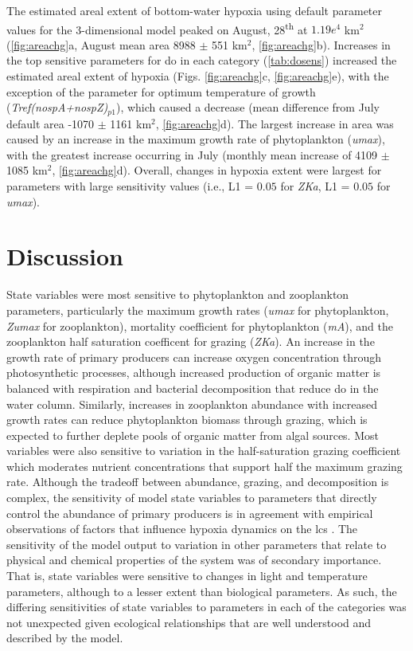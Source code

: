 \documentclass[review]{elsarticle}\usepackage[]{graphicx}\usepackage[]{color}
\begin{document}
The estimated areal extent of bottom-water hypoxia using default parameter values for the 3-dimensional model peaked on August, 28\textsuperscript{th} at $1.19e^{4}$ km$^2$ (\cref{fig:areachg}a, August mean area 8988 $\pm$ 551 km$^2$, \cref{fig:areachg}b). Increases in the top sensitive parameters for \ac{do} in each category (\cref{tab:dosens}) increased the estimated areal extent of hypoxia (Figs. \ref{fig:areachg}c, \ref{fig:areachg}e), with the exception of the parameter for optimum temperature of growth (\textit{Tref(nospA+nospZ)$_{p1}$}), which caused a decrease (mean difference from July default area -1070 $\pm$ 1161 km$^2$, \cref{fig:areachg}d).  The largest increase in area was caused by an increase in the maximum growth rate of phytoplankton (\textit{umax}), with the greatest increase occurring in July (monthly mean increase of 4109 $\pm$ 1085 km$^2$, \cref{fig:areachg}d).  Overall, changes in hypoxia extent were largest for parameters with large sensitivity values (i.e., L1 = $0.05$ for \textit{ZKa}, L1 = $0.05$ for \textit{umax}).

\section{Discussion}

State variables were most sensitive to phytoplankton and zooplankton parameters, particularly the maximum growth rates (\textit{umax} for phytoplankton, \textit{Zumax} for zooplankton), mortality coefficient for phytoplankton (\textit{mA}), and the zooplankton half saturation coefficent for grazing (\textit{ZKa}). An increase in the growth rate of primary producers can increase oxygen concentration through photosynthetic processes, although increased production of organic matter is balanced with respiration and bacterial decomposition that reduce \ac{do} in the water column.  Similarly, increases in zooplankton abundance with increased growth rates can reduce phytoplankton biomass through grazing, which is expected to further deplete pools of organic matter from algal sources.  Most variables were also sensitive to variation in the half-saturation grazing coefficient which moderates nutrient concentrations that support half the maximum grazing rate. Although the tradeoff between abundance, grazing, and decomposition is complex, the sensitivity of model state variables to parameters that directly control the abundance of primary producers is in agreement with empirical observations of factors that influence hypoxia dynamics on the \ac{lcs} \citep{Fahnenstiel95,Roelke00,Eldridge10}. The sensitivity of the model output to variation in other parameters that relate to physical and chemical properties of the system was of secondary importance.  That is, state variables were sensitive to changes in light and temperature parameters, although to a lesser extent than biological parameters.  As such, the differing sensitivities of state variables to parameters in each of the categories was not unexpected given ecological relationships that are well understood and described by the model.    
\end{document}

